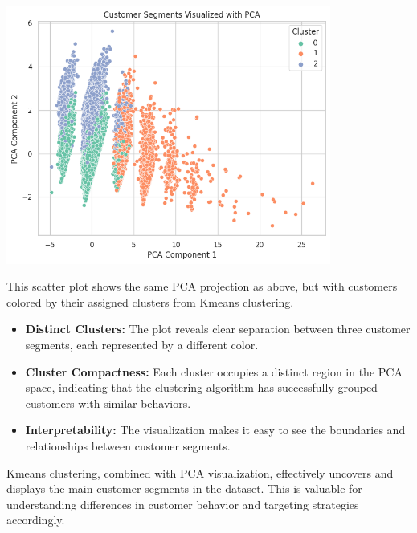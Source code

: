 \documentclass[a4paper]{article}
\begin{document}
\begin{multicols}{2}
\noindent
\begin{minipage}{\columnwidth}
\centering
\includegraphics[width=0.8\textwidth]{Customer Segments Visualized with PCA.png}
\label{fig:pca_kmeans}
\end{minipage}

This scatter plot shows the same PCA projection as above, but with customers colored by their assigned clusters from K\-means clustering.

\begin{itemize}
    \item \textbf{Distinct Clusters:} The plot reveals clear separation between three customer segments, each represented by a different color.
    \item \textbf{Cluster Compactness:} Each cluster occupies a distinct region in the PCA space, indicating that the clustering algorithm has successfully grouped customers with similar behaviors.
    \item \textbf{Interpretability:} The visualization makes it easy to see the boundaries and relationships between customer segments.
\end{itemize}

K\-means clustering, combined with PCA visualization, effectively uncovers and displays the main customer segments in the dataset. This is valuable for understanding differences in customer behavior and targeting strategies accordingly.

\vspace{1em}


\end{multicols}
\end{document}
